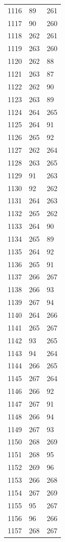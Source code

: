 \documentclass[a4paper,11pt]{article}
\begin{document}
\begin{center}
\begin{longtable}{|R{1.5cm}|R{1.5cm}|R{1.5cm}|}
 1116 &   89 &  261 \\
 1117 &   90 &  260 \\
 1118 &  262 &  261 \\
 1119 &  263 &  260 \\
 1120 &  262 &   88 \\
 1121 &  263 &   87 \\
 1122 &  262 &   90 \\
 1123 &  263 &   89 \\
 1124 &  264 &  265 \\
 1125 &  264 &   91 \\
 1126 &  265 &   92 \\
 1127 &  262 &  264 \\
 1128 &  263 &  265 \\
 1129 &   91 &  263 \\
 1130 &   92 &  262 \\
 1131 &  264 &  263 \\
 1132 &  265 &  262 \\
 1133 &  264 &   90 \\
 1134 &  265 &   89 \\
 1135 &  264 &   92 \\
 1136 &  265 &   91 \\
 1137 &  266 &  267 \\
 1138 &  266 &   93 \\
 1139 &  267 &   94 \\
 1140 &  264 &  266 \\
 1141 &  265 &  267 \\
 1142 &   93 &  265 \\
 1143 &   94 &  264 \\
 1144 &  266 &  265 \\
 1145 &  267 &  264 \\
 1146 &  266 &   92 \\
 1147 &  267 &   91 \\
 1148 &  266 &   94 \\
 1149 &  267 &   93 \\
 1150 &  268 &  269 \\
 1151 &  268 &   95 \\
 1152 &  269 &   96 \\
 1153 &  266 &  268 \\
 1154 &  267 &  269 \\
 1155 &   95 &  267 \\
 1156 &   96 &  266 \\
 1157 &  268 &  267 \\

\end{longtable}
\end{center}
\end{document}

